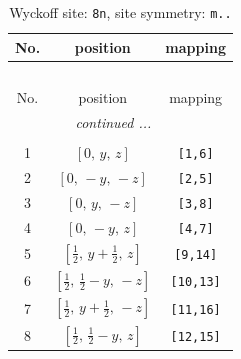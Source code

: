 \documentclass[fleqn,8pt]{jsarticle}
\begin{document}
\begin{longtable}{ccc}
\caption{Wyckoff site: {\tt 8n}, site symmetry: {\tt m..}}
 \\
 \hline \hline
No. & position & mapping \\ \hline \endfirsthead

\multicolumn{2}{l}{\tablename\ \thetable{}} \\
 \hline \hline
No. & position & mapping \\ \hline \endhead

 \hline \hline
\multicolumn{2}{r}{\footnotesize\it continued ...} \\ \endfoot

 \hline \hline
\multicolumn{2}{r}{} \\ \endlastfoot

1 & $\left[ 0,\, y,\, z \right]$ & {\tt [1,6]} \\ \hline
2 & $\left[ 0,\, - y,\, - z \right]$ & {\tt [2,5]} \\ \hline
3 & $\left[ 0,\, y,\, - z \right]$ & {\tt [3,8]} \\ \hline
4 & $\left[ 0,\, - y,\, z \right]$ & {\tt [4,7]} \\ \hline
5 & $\left[ \frac{1}{2},\, y + \frac{1}{2},\, z \right]$ & {\tt [9,14]} \\ \hline
6 & $\left[ \frac{1}{2},\, \frac{1}{2} - y,\, - z \right]$ & {\tt [10,13]} \\ \hline
7 & $\left[ \frac{1}{2},\, y + \frac{1}{2},\, - z \right]$ & {\tt [11,16]} \\ \hline
8 & $\left[ \frac{1}{2},\, \frac{1}{2} - y,\, z \right]$ & {\tt [12,15]} \\
\end{longtable}
\renewcommand{\arraystretch}{1.2}
\end{document}

